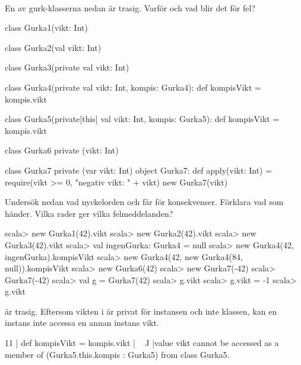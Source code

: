 \QUESTEND




\QUESTBEGIN

\Task  \what~

\Subtask En av gurk-klasserna nedan är trasig. Varför och vad blir det för fel?

\begin{Code}
class Gurka1(vikt: Int)

class Gurka2(val vikt: Int)

class Gurka3(private val vikt: Int)

class Gurka4(private val vikt: Int, kompis: Gurka4):
  def kompisVikt = kompis.vikt

class Gurka5(private[this] val vikt: Int, kompis: Gurka5):
  def kompisVikt = kompis.vikt

class Gurka6 private (vikt: Int)

class Gurka7 private (var vikt: Int)
object Gurka7:
  def apply(vikt: Int) =
    require(vikt >= 0, "negativ vikt: " + vikt)
    new Gurka7(vikt)
\end{Code}

\Subtask Undersök nedan vad nyckelorden  och  får för konsekvenser. Förklara vad som händer. Vilka rader ger vilka felmeddelanden?

\begin{REPL}
scala> new Gurka1(42).vikt
scala> new Gurka2(42).vikt
scala> new Gurka3(42).vikt
scala> val ingenGurka: Gurka4 = null
scala> new Gurka4(42, ingenGurka).kompisVikt
scala> new Gurka4(42, new Gurka4(84, null)).kompisVikt
scala> new Gurka6(42)
scala> new Gurka7(-42)
scala> Gurka7(-42)
scala> val g = Gurka7(42)
scala> g.vikt
scala> g.vikt = -1
scala> g.vikt
\end{REPL}


\SOLUTION


\TaskSolved \what

\SubtaskSolved {} är trasig. Eftersom vikten i  är privat för instansen och inte klassen, kan en instans inte accessa en annan instans vikt.
\begin{REPL}
11 |  def kompisVikt = kompis.vikt
   |                   ^^^^^^^^^^^
   |value vikt cannot be accessed as a member of (Gurka5.this.kompis : Gurka5) from class Gurka5.
\end{REPL}


